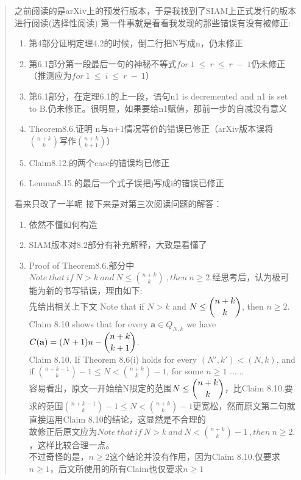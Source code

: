 \documentclass[11pt,a4paper]{article}
\begin{document}
\begin{quote}
    之前阅读的是arXiv上的预发行版本，于是我找到了SIAM上正式发行的版本进行阅读(选择性阅读)
    第一件事就是看看我发现的那些错误有没有被修正:
    \begin{enumerate}
        \item 第4部分证明定理4.2的时候，倒二行把N写成n，仍未修正
        \item 第6.1部分第一段最后一句的神秘不等式$for\ 1\ \leq\ r\ \leq\ r\ -\ 1$仍未修正（推测应为$for\ 1\ \leq\ i\ \leq\ r\ -\ 1$）
        \item 第6.1部分，在定理6.1的上一段，语句n1 is decremented and n1 is set to B.仍未修正。很明显，如果要给n1赋值，那前一步的自减没有意义
        \item Theorem8.6.证明 n与n+1情况等价的错误已修正（arXiv版本误将$\binom{n+k}{k}$写作$\binom{n+k}{k+1}$）
        \item Claim8.12.的两个case的错误均已修正
        \item Lemma8.15.的最后一个式子误把j写成i的错误已修正
    \end{enumerate}
    看来只改了一半呢
    接下来是对第三次阅读问题的解答：
    \begin{enumerate}
        \item 依然不懂如何构造
        \item SIAM版本对8.2部分有补充解释，大致是看懂了
        \item Proof of Theorem8.6.部分中 $Note\ that\ if\ N>k\ and\ N\leq \binom{n+k}{k}\ ,then\ n\geq 2.$经思考后，认为极可能为新的书写错误，理由如下:\\
        先给出相关上下文 Note that if $N>k$ and $N\leq \dbinom{n+k}{k}$, then $n\geq 2$. Claim 8.10 shows that for every $\mathbf{a}\in Q_{N,k}$ we have $C(\mathbf{a})=(N+1)n - \dbinom{n+k}{k+1}$.\\
        Claim 8.10. If Theorem 8.6(i) holds for every $(N',k')<(N,k)$, and if $\binom{n+k-1}{k} - 1\leq N<\binom{n+k}{k} - 1$, for some $n\geq 1$ ......\\
        容易看出，原文一开始给N限定的范围$N\leq \dbinom{n+k}{k}$，比Claim 8.10.要求的范围$\binom{n+k-1}{k} - 1\leq N<\binom{n+k}{k} - 1$更宽松，然而原文第二句就直接运用Claim 8.10的结论，这显然是不合理的\\
        故修正后原文应为$Note\ that\ if\ N>k\ and\ N<\binom{n+k}{k} - 1\ ,then\ n\geq 2.$，这样比较合理一点。\\
        不过奇怪的是，$n\geq 2$这个结论并没有作用，因为Claim 8.10.仅要求$n\geq 1$，后文所使用的所有Claim也仅要求$n\geq 1$
    \end{enumerate}
\end{quote}
\end{document}
